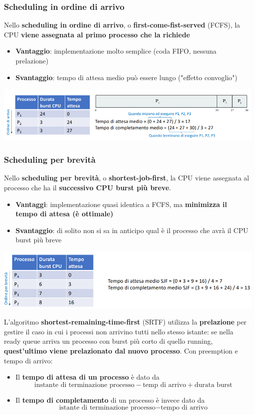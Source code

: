 \documentclass[12pt]{article}
\begin{document}
\subsubsection{Scheduling in ordine di arrivo}
Nello \textbf{scheduling in ordine di arrivo}, o \textbf{first-come-fist-served} (FCFS), la CPU \textbf{viene assegnata al primo processo che la richiede}
\begin{itemize}
    \item \textbf{Vantaggio}: implementazione molto semplice (coda FIFO, nessuna prelazione)
    \item \textbf{Svantaggio}: tempo di attesa medio può essere lungo ("effetto convoglio")
\end{itemize}
\begin{center}
    \includegraphics[width = 1\linewidth]{Images/45.png}
\end{center}
\subsubsection{Scheduling per brevità}
Nello \textbf{scheduling per brevità}, o \textbf{shortest-job-first}, la CPU viene assegnata al processo che ha il \textbf{successivo CPU burst più breve}.
\begin{itemize}
    \item \textbf{Vantaggi}: implementazione quasi identica a FCFS, ma \textbf{minimizza il tempo di attesa (è ottimale)}
    \item \textbf{Svantaggio}: di solito non si sa in anticipo qual è il processo che avrà il CPU burst più breve
\end{itemize}
\begin{center}
    \includegraphics[width = 0.90\linewidth]{Images/46.png}
\end{center}
L'algoritmo \textbf{shortest-remaining-time-first} (SRTF) utilizza la \textbf{prelazione} per gestire il caso in cui i processi non arrivino tutti nello stesso istante:
se nella ready queue arriva un processo con burst più corto di quello running, \textbf{quest'ultimo viene prelazionato dal nuovo processo}. Con preemption e tempo di arrivo:
\begin{itemize}
    \item Il \textbf{tempo di attesa di un processo} è dato da
    $$\textrm{instante di terminazione processo} - \textrm{temp di arrivo} + \textrm{durata burst}$$
    \item Il \textbf{tempo di completamento} di un processo è invece dato da
    $$\textrm{istante di terminazione processo} - \textrm{tempo di arrivo}$$
\end{itemize}
\end{document}
